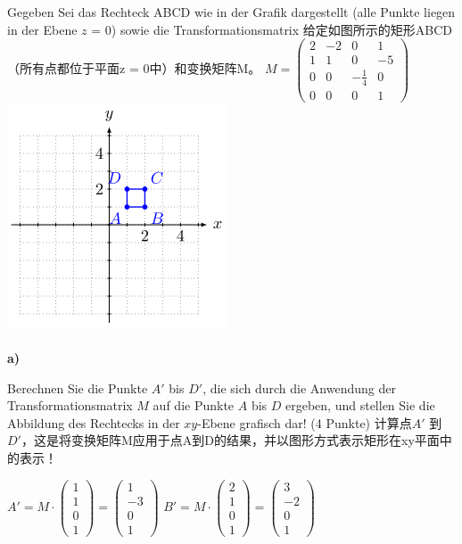 \documentclass[fleqn]{article}
\begin{document}
Gegeben Sei das Rechteck ABCD wie in der Grafik dargestellt (alle Punkte liegen in der Ebene $z$ = 0) sowie die Transformationsmatrix
给定如图所示的矩形ABCD（所有点都位于平面z = 0中）和变换矩阵M。
$M=\begin{pmatrix}
    2&-2&0&1\\
    1&1&0&-5\\
    0&0&-\frac{1}{4}&0\\
    0&0&0&1
\end{pmatrix}$
\includegraphics[scale=0.4]{5.png}
\\
\\
\textbf{a)} 

Berechnen Sie die Punkte $A'$ bis $D'$, die sich durch die Anwendung der Transformationsmatrix $M$ auf die Punkte $A$ bis $D$ ergeben, und stellen Sie die Abbildung des Rechtecks in der $xy$-Ebene grafisch dar! (4 Punkte)
计算点$A'$ 到 $D'$，这是将变换矩阵M应用于点A到D的结果，并以图形方式表示矩形在xy平面中的表示！

$A' = M\cdot\begin{pmatrix} 1 \\ 1 \\ 0 \\ 1 \end{pmatrix} =\begin{pmatrix} 1 \\ -3 \\ 0 \\ 1 \end{pmatrix} $
\qquad$B' = M\cdot\begin{pmatrix} 2 \\ 1 \\ 0 \\ 1 \end{pmatrix} =\begin{pmatrix} 3 \\ -2 \\ 0 \\ 1 \end{pmatrix} $
\end{document}
